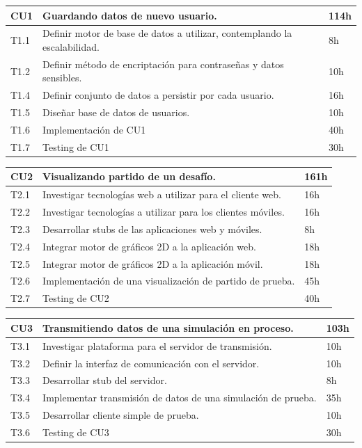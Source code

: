 \documentclass[a4paper, 10pt, twoside]{article}
\begin{document}
\begin{tabular}{lp{13cm}l}
  \hline
  CU1 & Guardando datos de nuevo usuario. & 114h \\
  \hline
  T1.1 & Definir motor de base de datos a utilizar, contemplando la escalabilidad. & 8h \\
  T1.2 & Definir método de encriptación para contraseñas y datos sensibles. & 10h \\
  T1.4 & Definir conjunto de datos a persistir por cada usuario. & 16h \\
  T1.5 & Diseñar base de datos de usuarios. & 10h \\
  T1.6 & Implementación de CU1 & 40h\\
  T1.7 & Testing de CU1 & 30h\\
  \hline
\end{tabular}

\vspace{1em}

\begin{tabular}{lp{13cm}l}
  \hline
  CU2 & Visualizando partido de un desafío. & 161h \\
  \hline
  T2.1 & Investigar tecnologías web a utilizar para el cliente web. & 16h \\
  T2.2 & Investigar tecnologías a utilizar para los clientes móviles. & 16h \\
  T2.3 & Desarrollar stubs de las aplicaciones web y móviles. & 8h \\
  T2.4 & Integrar motor de gráficos 2D a la aplicación web. & 18h \\
  T2.5 & Integrar motor de gráficos 2D a la aplicación móvil. & 18h \\
  T2.6 & Implementación de una visualización de partido de prueba. & 45h \\
  T2.7 & Testing de CU2 & 40h\\
  \hline
\end{tabular}

\vspace{1em}

\begin{tabular}{lp{13cm}l}
  \hline
  CU3 & Transmitiendo datos de una simulación en proceso. & 103h \\
  \hline
  T3.1 & Investigar plataforma para el servidor de transmisión. & 10h \\
  T3.2 & Definir la interfaz de comunicación con el servidor. & 10h \\
  T3.3 & Desarrollar stub del servidor. & 8h \\
  T3.4 & Implementar transmisión de datos de una simulación de prueba. & 35h \\
  T3.5 & Desarrollar cliente simple de prueba. & 10h \\
  T3.6 & Testing de CU3 & 30h\\
  \hline
\end{tabular}
\end{document}
